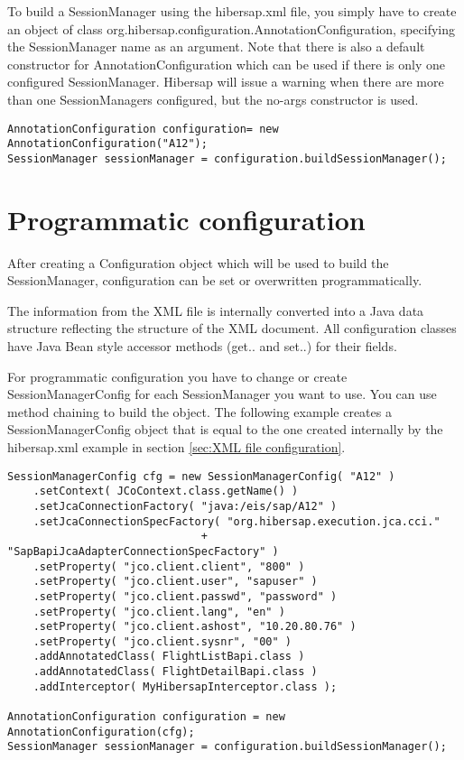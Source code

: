 To build a SessionManager using the hibersap.xml file, you simply have to create an object of
class org.\-hibersap.\-configuration.\-AnnotationConfiguration, specifying the SessionManager name as an argument. Note 
that there is also a default constructor for AnnotationConfiguration which can be used if there 
is only one configured SessionManager. Hibersap will issue a warning when there are more than one SessionManagers 
configured, but the no-args constructor is used. 

\begin{lstlisting}[label=hibersap.xml]
AnnotationConfiguration configuration= new AnnotationConfiguration("A12");
SessionManager sessionManager = configuration.buildSessionManager();
\end{lstlisting}


\section{Programmatic configuration}
\label{sec:Programmatic configuration}

After creating a Configuration object which will be used to build the SessionManager, configuration can be set or
overwritten programmatically.

The information from the XML file is internally converted into a Java data structure reflecting the structure of the
XML document. All configuration classes have Java Bean style accessor methods (get.. and set..) for
their fields. 

For programmatic configuration you have to change or create SessionManagerConfig for each 
SessionManager you want to use. You can use method chaining to build the
object. The following example creates a  SessionManagerConfig object that is equal to the one created internally by the
hibersap.xml example in section \ref{sec:XML file configuration}. 

\begin{lstlisting}[caption=Programmatic configuration]
SessionManagerConfig cfg = new SessionManagerConfig( "A12" )
    .setContext( JCoContext.class.getName() )
    .setJcaConnectionFactory( "java:/eis/sap/A12" )
    .setJcaConnectionSpecFactory( "org.hibersap.execution.jca.cci." 
                              + "SapBapiJcaAdapterConnectionSpecFactory" )
    .setProperty( "jco.client.client", "800" )
    .setProperty( "jco.client.user", "sapuser" )
    .setProperty( "jco.client.passwd", "password" )
    .setProperty( "jco.client.lang", "en" )
    .setProperty( "jco.client.ashost", "10.20.80.76" )
    .setProperty( "jco.client.sysnr", "00" )
    .addAnnotatedClass( FlightListBapi.class )
    .addAnnotatedClass( FlightDetailBapi.class )
    .addInterceptor( MyHibersapInterceptor.class );

AnnotationConfiguration configuration = new AnnotationConfiguration(cfg);
SessionManager sessionManager = configuration.buildSessionManager();
\end{lstlisting}








